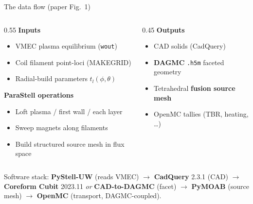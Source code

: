 \documentclass[aspectratio=169]{beamer}
\newcommand{\kb}[1]{\begin{tcolorbox}[colback=key!5,colframe=key!60,boxsep=2pt,left=4pt,right=4pt,top=3pt,bottom=3pt]#1\end{tcolorbox}}
\begin{document}
\begin{frame}{The data flow (paper Fig.~1)}
  \begin{columns}[c]
    \begin{column}{0.55\textwidth}
      \textbf{Inputs}
      \begin{itemize}\small
        \item VMEC plasma equilibrium (\texttt{wout})
        \item Coil filament point-loci (MAKEGRID)
        \item Radial-build parameters $t_l(\phi,\theta)$
      \end{itemize}
      \textbf{ParaStell operations}
      \begin{itemize}\small
        \item Loft plasma / first wall / each layer
        \item Sweep magnets along filaments
        \item Build structured source mesh in flux space
      \end{itemize}
    \end{column}
    \begin{column}{0.45\textwidth}
      \textbf{Outputs}
      \begin{itemize}\small
        \item CAD solids (CadQuery)
        \item \textbf{DAGMC} \texttt{.h5m} faceted geometry
        \item Tetrahedral \textbf{fusion source mesh}
        \item OpenMC tallies (TBR, heating, \dots)
      \end{itemize}
    \end{column}
  \end{columns}
  \vspace{0.5em}
  \kb{\footnotesize Software stack: \textbf{PyStell-UW} (reads VMEC) $\to$ \textbf{CadQuery} 2.3.1 (CAD) $\to$ \textbf{Coreform Cubit} 2023.11 \emph{or} \textbf{CAD-to-DAGMC} (facet) $\to$ \textbf{PyMOAB} (source mesh) $\to$ \textbf{OpenMC} (transport, DAGMC-coupled).}
\end{frame}
\end{document}
